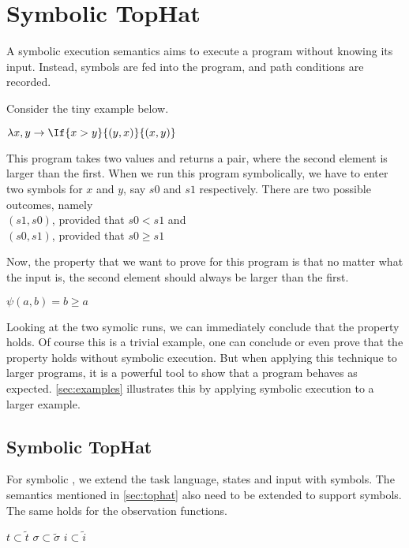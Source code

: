
\section{Symbolic TopHat}
\label{sec:symbolic}

A symbolic execution semantics aims to execute a program without knowing its input.
Instead, symbols are fed into the program, and path conditions are recorded.

Consider the tiny example below.

\begin{TASK}
  $\lambda x,y \rightarrow \If{x>y}{(y,x)}{(x,y)}$
\end{TASK}

This program takes two values and returns a pair, where the second element is larger than the first.
When we run this program symbolically, we have to enter two symbols for $x$ and $y$, say $s0$ and $s1$ respectively.
There are two possible outcomes, namely\\
$(s1,s0)$, provided that $s0<s1$ and\\
$(s0,s1)$, provided that $s0\geq s1$

Now, the property that we want to prove for this program is that no matter what the input is, the second element should always be larger than the first.

$\psi(a,b)=b\geq a$

Looking at the two symolic runs, we can immediately conclude that the property holds.
Of course this is a trivial example, one can conclude or even prove that the property holds without symbolic execution.
But when applying this technique to larger programs, it is a powerful tool to show that a program behaves as expected.
\cref{sec:examples} illustrates this by applying symbolic execution to a larger example.






\subsection{Symbolic TopHat}


For symbolic \TOPHAT, we extend the task language, states and input with symbols.
The semantics mentioned in \cref{sec:tophat} also need to be extended to support symbols.
The same holds for the observation functions.

$t\subset \tilde{t}$
$\sigma \subset \tilde{\sigma}$
$i\subset \tilde{i}$



